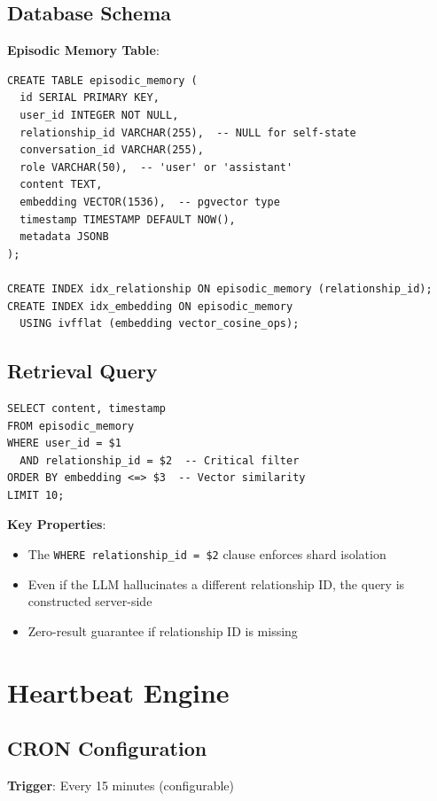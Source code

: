 \subsection{Database Schema}

\textbf{Episodic Memory Table}:
\begin{verbatim}
CREATE TABLE episodic_memory (
  id SERIAL PRIMARY KEY,
  user_id INTEGER NOT NULL,
  relationship_id VARCHAR(255),  -- NULL for self-state
  conversation_id VARCHAR(255),
  role VARCHAR(50),  -- 'user' or 'assistant'
  content TEXT,
  embedding VECTOR(1536),  -- pgvector type
  timestamp TIMESTAMP DEFAULT NOW(),
  metadata JSONB
);

CREATE INDEX idx_relationship ON episodic_memory (relationship_id);
CREATE INDEX idx_embedding ON episodic_memory
  USING ivfflat (embedding vector_cosine_ops);
\end{verbatim}

\subsection{Retrieval Query}

\begin{verbatim}
SELECT content, timestamp
FROM episodic_memory
WHERE user_id = $1
  AND relationship_id = $2  -- Critical filter
ORDER BY embedding <=> $3  -- Vector similarity
LIMIT 10;
\end{verbatim}

\textbf{Key Properties}:
\begin{itemize}
    \item The \texttt{WHERE relationship\_id = \$2} clause enforces shard isolation
    \item Even if the LLM hallucinates a different relationship ID, the query is constructed server-side
    \item Zero-result guarantee if relationship ID is missing
\end{itemize}

\section{Heartbeat Engine}

\subsection{CRON Configuration}

\textbf{Trigger}: Every 15 minutes (configurable)

